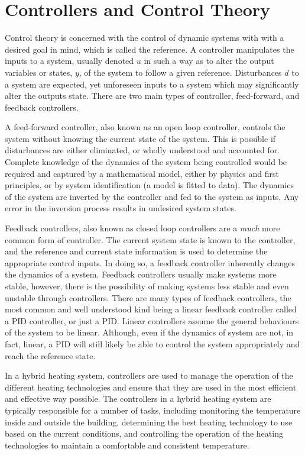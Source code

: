 \section{Controllers and Control Theory}
Control theory is concerned with the control of dynamic systems with with a desired goal in mind, which is called the reference. A controller manipulates the inputs to a system, usually denoted $u$ in such a way as to alter the output variables or states, $y$, of the system to follow a given reference. Disturbances $d$ to a system are expected, yet unforeseen inputs to a system which may significantly alter the outputs state.  There are two main types of controller, feed-forward, and feedback controllers.

A feed-forward controller, also known as an open loop controller, controls the system without knowing the current state of the system. This is possible if disturbances are either eliminated, or wholly understood and accounted for. Complete knowledge of the dynamics of the system being controlled would be required and captured by a mathematical model, either by physics and first principles, or by system identification (a model is fitted to data). The dynamics of the system are inverted by the controller and fed to the system as inputs. Any error in the inversion process results in undesired system states. 

Feedback controllers, also known as closed loop controllers are a \textit{much} more common form of controller. The current system state is known to the controller, and the reference and current state information is used to determine the appropriate control inputs. In doing so, a feedback controller inherently changes the dynamics of a system. Feedback controllers usually make systems more stable, however, there is the possibility of making systems less stable and even unstable through controllers. There are many types of feedback controllers, the most common and well understood kind being a linear feedback controller called a \ac{PID} controller, or just a \ac{PID}. Linear controllers assume the general behaviours of the system to be linear. Although, even if the dynamics of system are not, in fact, linear, a \ac{PID} will still likely be able to control the system appropriately and reach the reference state.

In a hybrid heating system, controllers are used to manage the operation of the different heating technologies and ensure that they are used in the most efficient and effective way possible. The controllers in a hybrid heating system are typically responsible for a number of tasks, including monitoring the temperature inside and outside the building, determining the best heating technology to use based on the current conditions, and controlling the operation of the heating technologies to maintain a comfortable and consistent temperature.

